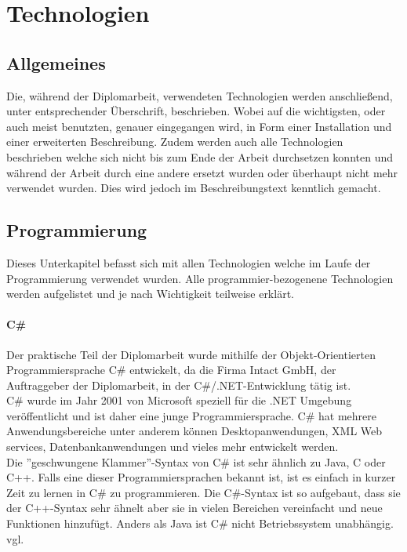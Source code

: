 \renewcommand{\theauthor}{Dario Wagner}
\chapter{Technologien}
\label{sec:Technologien}
\section{Allgemeines}
\label{sec:TechnologieAllgemeines}
Die, während der Diplomarbeit, verwendeten Technologien werden anschließend, unter entsprechender Überschrift, beschrieben. Wobei auf die wichtigsten, oder auch meist benutzten, genauer eingegangen wird, in Form einer Installation und einer erweiterten Beschreibung. Zudem werden auch alle Technologien beschrieben welche sich nicht bis zum Ende der Arbeit durchsetzen konnten und während der Arbeit durch eine andere ersetzt wurden oder überhaupt nicht mehr verwendet wurden. Dies wird jedoch im Beschreibungstext kenntlich gemacht.
\section{Programmierung}
\label{sec:TechnologieProgrammierung}
Dieses Unterkapitel befasst sich mit allen Technologien welche im Laufe der Programmierung verwendet wurden. Alle programmier-bezogenene Technologien werden aufgelistet und je nach Wichtigkeit teilweise erklärt.
\subsubsection{C\#}
\label{sec:CSharp}
Der praktische Teil der Diplomarbeit wurde mithilfe der Objekt-Orientierten Programmiersprache C\# entwickelt, da die Firma Intact GmbH, der Auftraggeber der Diplomarbeit, in der C\#/.NET-Entwicklung tätig ist. \\ \break
C\# wurde im Jahr 2001 von Microsoft speziell für die .NET Umgebung veröffentlicht und ist daher eine junge Programmiersprache. C\# hat mehrere Anwendungsbereiche unter anderem können Desktopanwendungen, XML Web services, Datenbankanwendungen und vieles mehr entwickelt werden. \\ \break
Die ''geschwungene Klammer''-Syntax von C\# ist sehr ähnlich zu Java, C oder C++. Falls eine dieser Programmiersprachen bekannt ist, ist es einfach in kurzer Zeit zu lernen in C\# zu programmieren. Die C\#-Syntax ist so aufgebaut, dass sie der C++-Syntax sehr ähnelt aber sie in vielen Bereichen vereinfacht und neue Funktionen hinzufügt. Anders als Java ist C\# nicht Betriebssystem unabhängig. \\vgl. \cite{TechnologieCSharpErklaerung} 
